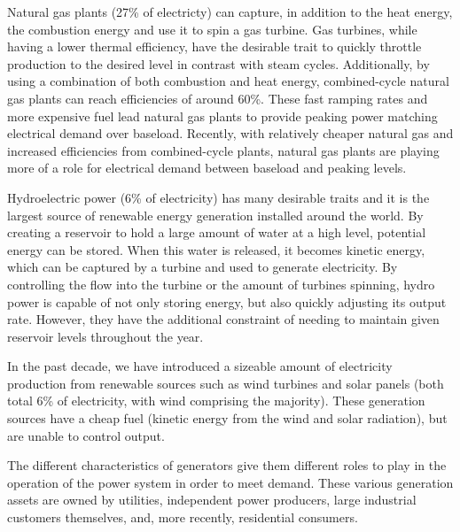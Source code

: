 	Natural gas plants (27\% of electricty) can capture, in addition to the heat energy, the combustion energy and use it to spin a gas turbine.  Gas turbines, while having a lower thermal efficiency, have the desirable trait to quickly throttle production to the desired level in contrast with steam cycles.  Additionally, by using a combination of both combustion and heat energy, combined-cycle natural gas plants can reach efficiencies of around 60\%.  These fast ramping rates and more expensive fuel lead natural gas plants to provide peaking power matching electrical demand over baseload.  Recently, with relatively cheaper natural gas and increased efficiencies from combined-cycle plants, natural gas plants are playing more of a role for electrical demand between baseload and peaking levels.    

	Hydroelectric power (6\% of electricity) has many desirable traits and it is the largest source of renewable energy generation installed around the world.  By creating a reservoir to hold a large amount of water at a high level, potential energy can be stored.  When this water is released, it becomes kinetic energy, which can be captured by a turbine and used to generate electricity.  By controlling the flow into the turbine or the amount of turbines spinning, hydro power is capable of not only storing energy, but also quickly adjusting its output rate.  However, they have the additional constraint of needing to maintain given reservoir levels throughout the year.

	In the past decade, we have introduced a sizeable amount of electricity production from renewable sources such as wind turbines and solar panels (both total 6\% of electricity, with wind comprising the majority).  These generation sources have a cheap fuel (kinetic energy from the wind and solar radiation), but are unable to control output.  

	The different characteristics of generators give them different roles to play in the operation of the power system in order to meet demand.  These various generation assets are owned by utilities, independent power producers, large industrial customers themselves, and, more recently, residential consumers.  

